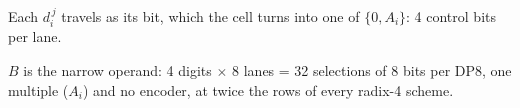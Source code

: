 \documentclass[fleqn]{article}
\begin{document}
\noindent Each $d_i^{\,j}$ travels as its bit, which the cell turns into one of $\{0, A_i\}$:
4 control bits per lane.

\vspace{0.8em}

\noindent $B$ is the narrow operand: 4 digits $\times$ 8 lanes = 32 selections of
8 bits per DP8, one multiple ($A_i$) and no encoder, at twice the rows of every
radix-4 scheme.
\end{document}
